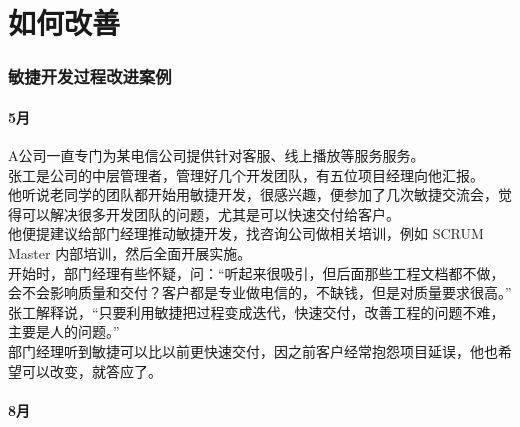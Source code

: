 \chapter{如何改善} %

\hypertarget{ux67d0ux8f6fux4ef6ux5f00ux53d1ux516cux53f8ux654fux6377ux5f00ux53d1ux8fc7ux7a0bux6539ux8fdbux6848ux4f8b}{%
\subsection{敏捷开发过程改进案例}\label{ux67d0ux8f6fux4ef6ux5f00ux53d1ux516cux53f8ux654fux6377ux5f00ux53d1ux8fc7ux7a0bux6539ux8fdbux6848ux4f8b}}

\hypertarget{ux6708}{%
\subsubsection{5月}\label{ux6708}}

A公司一直专门为某电信公司提供针对客服、线上播放等服务服务。\\

张工是公司的中层管理者，管理好几个开发团队，有五位项目经理向他汇报。\\

他听说老同学的团队都开始用敏捷开发，很感兴趣，便参加了几次敏捷交流会，觉得可以解决很多开发团队的问题，尤其是可以快速交付给客户。\\

他便提建议给部门经理推动敏捷开发，找咨询公司做相关培训，例如 SCRUM Master 内部培训，然后全面开展实施。\\

开始时，部门经理有些怀疑，问：“听起来很吸引，但后面那些工程文档都不做，会不会影响质量和交付？客户都是专业做电信的，不缺钱，但是对质量要求很高。”\\

张工解释说，“只要利用敏捷把过程变成迭代，快速交付，改善工程的问题不难，主要是人的问题。”\\


部门经理听到敏捷可以比以前更快速交付，因之前客户经常抱怨项目延误，他也希望可以改变，就答应了。\\



\hypertarget{ux6708-1}{%
\subsubsection{8月}\label{ux6708-1}}

